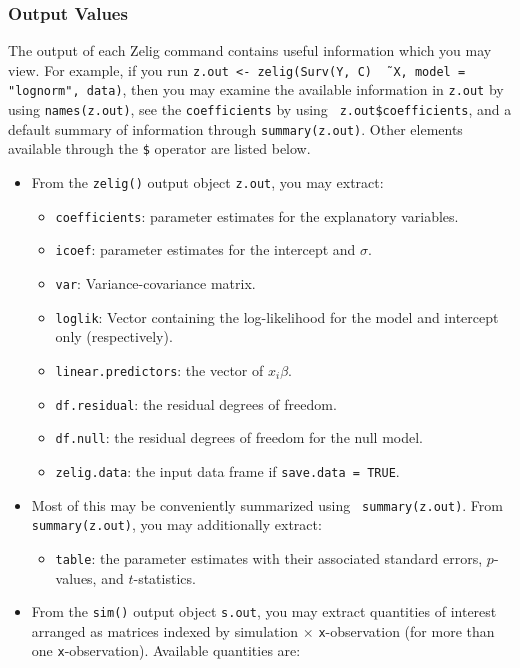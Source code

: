 
\subsubsection{Output Values}

The output of each Zelig command contains useful information which you
may view.  For example, if you run \texttt{z.out <- zelig(Surv(Y,
  C) \~\, X, model = "lognorm", data)}, then you may examine the
available information in \texttt{z.out} by using
\texttt{names(z.out)}, see the {\tt coefficients} by using {\tt
  z.out\$coefficients}, and a default summary of information
through \texttt{summary(z.out)}.  Other elements available through
the {\tt \$} operator are listed below.

\begin{itemize}
\item From the {\tt zelig()} output object {\tt z.out}, you may extract:
   \begin{itemize}
   \item {\tt coefficients}: parameter estimates for the explanatory
     variables.
   \item {\tt icoef}: parameter estimates for the intercept and $\sigma$.  
   \item {\tt var}: Variance-covariance matrix.  
   \item {\tt loglik}: Vector containing the log-likelihood for the
     model and intercept only (respectively).
   \item {\tt linear.predictors}: the vector of
     $x_{i}\beta$.
   \item {\tt df.residual}: the residual degrees of freedom.
   \item {\tt df.null}: the residual degrees of freedom for the null
     model.
   \item {\tt zelig.data}: the input data frame if {\tt save.data = TRUE}.  
   \end{itemize}

\item Most of this may be conveniently summarized using {\tt
   summary(z.out)}.  From {\tt summary(z.out)}, you may
 additionally extract: 
   \begin{itemize}
   \item {\tt table}: the parameter estimates with their
     associated standard errors, $p$-values, and $t$-statistics.
   \end{itemize}

\item From the {\tt sim()} output object {\tt s.out}, you may extract
  quantities of interest arranged as matrices indexed by simulation
  $\times$ {\tt x}-observation (for more than one {\tt x}-observation).
  Available quantities are:


\end{itemize}

